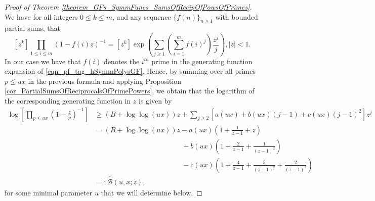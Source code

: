 \documentclass[11pt,reqno,a4letter]{article}
\numberwithin{figure}{section}
\numberwithin{table}{section}
\theoremstyle{plain}
\numberwithin{theorem}{section}
\theoremstyle{definition}
\newcommand{\NBRef}[1]{}
\begin{document}
\NBRef{A06-2020-04-26} 
\begin{proof}[Proof of Theorem \ref{theorem_GFs_SymmFuncs_SumsOfRecipOfPowsOfPrimes}] 
\label{proofOf_theorem_GFs_SymmFuncs_SumsOfRecipOfPowsOfPrimes} 
We have for all integers $0 \leq k \leq m$, and any sequence 
$\{f(n)\}_{n \geq 1}$ with bounded partial sums, that 
\cite[\S 2]{MACDONALD-SYMFUNCS} 
\begin{equation} 
\label{eqn_pf_tag_hSymmPolysGF} 
[z^k] \prod_{1 \leq i \leq m} (1-f(i) z)^{-1} = [z^k] \exp\left(\sum_{j \geq 1} 
     \left(\sum_{i=1}^m f(i)^j\right) \frac{z^j}{j}\right), |z| < 1. 
\end{equation} 
In our case we have that $f(i)$ denotes the $i^{th}$ prime in the 
generating function expansion of \eqref{eqn_pf_tag_hSymmPolysGF}. 
Hence, by summing over all primes $p \leq ux$ in the previous formula and applying 
Proposition \ref{cor_PartialSumsOfReciprocalsOfPrimePowers}, we obtain that the logarithm of the corresponding 
generating function in $z$ is given by 
\begin{align*} 
\log\left[\prod_{p \leq ux} \left(1-\frac{z}{p}\right)^{-1}\right] & \geq (B + \log\log (ux)) z + 
     \sum_{j \geq 2} \left[a(ux) + b(ux)(j-1) + c(ux) (j-1)^2\right] z^j \\ 
     & = (B + \log\log (ux)) z - a(ux) \left(1 + \frac{1}{z-1} + z\right) \\ 
     & \phantom{= (B + \log\log (ux)) z\ } + 
     b(ux) \left( 
     1 + \frac{2}{z-1} + \frac{1}{(z-1)^2}\right) \\ 
     & \phantom{= (B + \log\log (ux)) z\ } - 
     c(ux) \left( 
     1 + \frac{4}{z-1} + \frac{5}{(z-1)^2} + \frac{2}{(z-1)^3}\right) \\ 
     & =: \widehat{\mathcal{B}}(u, x; z), 
\end{align*} 
for some minimal parameter $u$ that we will determine below. 


\end{proof}
\end{document}
